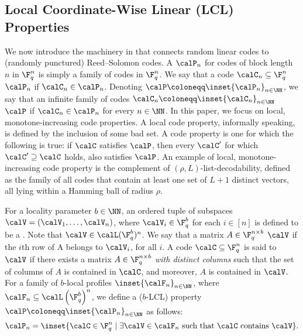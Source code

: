 \documentclass{article}
\begin{document}
\subsection{Local Coordinate-Wise Linear (LCL) Properties}
We now introduce the machinery in \cite{levi2024random} that connects random linear codes to (randomly punctured) Reed--Solomon codes.
A  $\calP_n$ for codes of block length $n$ in $\F_q^n$ is simply a family of codes in $\F_q^n$. We say that a code $\calC_n \subseteq \F_q^n$  $\calP_n$ if $\calC_n \in \calP_n$.
Denoting $\calP \coloneqq \inset{\calP_n}_{n \in \NN}$, we say that an infinite family of codes $\calC_n \coloneqq \inset{\calC_n}_{n \in \NN}$  $\calP$ if $\calC_n \in \calP_n$ for every $n \in \NN$.
In this paper, we focus on local, monotone-increasing code properties.
A local code property, informally speaking, is defined by the inclusion of some bad set. A  code property is one for which the following is true: if $\calC$ satisfies $\calP$, then every $\calC'$ for which $\calC' \supseteq \calC$ holds, also satisfies $\calP$.
An example of local, monotone-increasing code property is the complement of $(\rho, L)$-list-decodability, defined as the family of all codes that contain at least one set of $L+1$ distinct vectors, all lying within a Hamming ball of radius $\rho$.

For a locality parameter $b \in \NN$, an ordered tuple of subspaces $\calV= (\calV_1, \ldots, \calV_n)$, where $\calV_i \in \F_q^b$ for each $i \in [n]$ is defined to be a .
Note that $\calV \in \calL(\F_q^b)^n$.
We say that a matrix $A \in \F_q^{n \times b}$  $\calV$ if the $i$th row of A belongs to $\calV_i$, for all $i$.
A code $\calC \subseteq \F_q^n$ is said to  $\calV$ if there exists a matrix $A \in \F_q^{n \times b}$ \emph{with distinct columns} such that the set of columns of $A$ is contained in $\calC$, and moreover, $A$ is contained in $\calV$.
For a family of $b$-local profiles $\inset{\calF_n}_{n \in \NN}$, where $\calF_n \subseteq \calL\left(\F_q^b\right)^n$, we define a  ($b$-LCL) property $\calP \coloneqq \inset{\calP_n}_{n \in \NN}$ as follows:
\[
    \calP_n = \inset{\calC \in \F_q^n \mid \exists \calV \in \calF_n \textrm{ such that } \calC \textrm{ contains } \calV}.
\]
\end{document}
